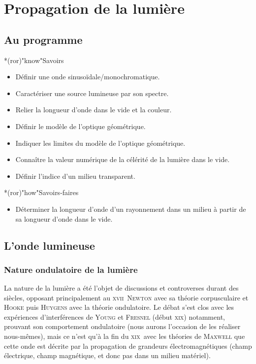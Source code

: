 \documentclass[../../main/main.tex]{subfiles}
\begin{document}
\chapter{Propagation de la lumi\`ere}

\section*{Au programme}
\begin{tcb}*(ror)"know"{Savoirs}
	\begin{itemize}[label=$\diamond$, leftmargin=10pt]
		\item Définir une onde sinusoïdale/monochromatique.
		\item Caractériser une source lumineuse par son spectre.
		\item Relier la longueur d'onde dans le vide et la couleur.
		\item Définir le modèle de l'optique géométrique.
		\item Indiquer les limites du modèle de l'optique géométrique.
		\item Connaître la valeur numérique de la célérité de la lumière dans le
		      vide.
		\item Définir l'indice d'un milieu transparent.
	\end{itemize}

\end{tcb}

\begin{tcb}*(ror)"how"{Savoirs-faires}
	\begin{itemize}[label=$\diamond$, leftmargin=10pt]
		\item Déterminer la longueur d'onde d'un rayonnement dans un milieu à partir
		      de sa longueur d'onde dans le vide.
	\end{itemize}

\end{tcb}

\section{L'onde lumineuse}

\subsection{Nature ondulatoire de la lumière}

La nature de la lumière a été l'objet de discussions et controverses durant des
siècles, opposant principalement au \textsc{xvii}\ieme\ \textsc{Newton} avec sa
théorie corpusculaire et \textsc{Hooke} puis \textsc{Huygens} avec la théorie
ondulatoire. Le débat s'est clos avec les expériences d'interférences de
\textsc{Young} et \textsc{Fresnel} (début \textsc{xix}\ieme) notamment, prouvant
son comportement ondulatoire (nous aurons l'occasion de les réaliser
nous-mêmes), mais ce n'est qu'à la fin du \textsc{xix}\ieme\ avec les théories
de \textsc{Maxwell} que cette onde est décrite par la propagation de grandeurs
électromagnétiques (champ électrique, champ magnétique, et donc pas dans un
milieu matériel).
\end{document}
